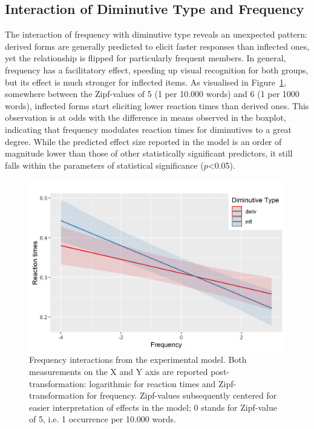 \subsection{Interaction of Diminutive Type and Frequency} \label{subsec:interaction}
The interaction of frequency with diminutive type reveals an unexpected pattern: derived forms are generally predicted to elicit faster responses than inflected ones, yet the relationship is flipped for particularly frequent members. In general, frequency has a facilitatory effect, speeding up visual recognition for both groups, but its effect is much stronger for inflected items. As visualised in Figure~\ref{fig:interaction}, somewhere between the Zipf-values of 5 (1 per 10.000 words) and 6 (1 per 1000 words), inflected forms start eliciting lower reaction times than derived ones. This observation is at odds with the difference in means observed in the boxplot, indicating that frequency modulates reaction times for diminutives to a great degree. While the predicted effect size reported in the model is an order of magnitude lower than those of other statistically significant predictors, it still falls within the parameters of statistical significance ($p$<0.05).
\begin{figure}[ht]
    \centering
    \includegraphics[width=\textwidth]{images/mod_int.png}
    \caption[Frequency interactions from the experimental model]{Frequency interactions from the experimental model. Both measurements on the X and Y axis are reported post-transformation: logarithmic for reaction times and Zipf-transformation for frequency. Zipf-values subsequently centered for easier interpretation of effects in the model; 0 stands for Zipf-value of 5, i.e. 1 occurrence per 10.000 words.}
    \label{fig:interaction}
\end{figure}
